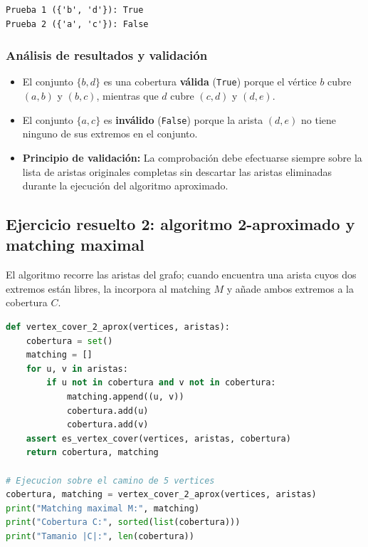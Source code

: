 \begin{lstlisting}[style=consolestyle, caption={Salida de consola del Ejercicio Resuelto 1}]
Prueba 1 ({'b', 'd'}): True
Prueba 2 ({'a', 'c'}): False
\end{lstlisting}

\subsubsection*{Análisis de resultados y validación}
\begin{itemize}
    \item El conjunto $\{b, d\}$ es una cobertura \textbf{válida} (\texttt{True}) porque el vértice $b$ cubre $(a, b)$ y $(b, c)$, mientras que $d$ cubre $(c, d)$ y $(d, e)$.
    \item El conjunto $\{a, c\}$ es \textbf{inválido} (\texttt{False}) porque la arista $(d, e)$ no tiene ninguno de sus extremos en el conjunto.
    \item \textbf{Principio de validación:} La comprobación debe efectuarse siempre sobre la lista de aristas originales completas sin descartar las aristas eliminadas durante la ejecución del algoritmo aproximado.
\end{itemize}

\subsection{Ejercicio resuelto 2: algoritmo 2-aproximado y matching maximal}
El algoritmo recorre las aristas del grafo; cuando encuentra una arista cuyos dos extremos están libres, la incorpora al matching $M$ y añade ambos extremos a la cobertura $C$.

\begin{lstlisting}[language=Python, caption={Código del Ejercicio Resuelto 2 (algoritmo aproximado y ejecución)}, label={lst:vc_aprox}]
def vertex_cover_2_aprox(vertices, aristas):
    cobertura = set()
    matching = []
    for u, v in aristas:
        if u not in cobertura and v not in cobertura:
            matching.append((u, v))
            cobertura.add(u)
            cobertura.add(v)
    assert es_vertex_cover(vertices, aristas, cobertura)
    return cobertura, matching

# Ejecucion sobre el camino de 5 vertices
cobertura, matching = vertex_cover_2_aprox(vertices, aristas)
print("Matching maximal M:", matching)
print("Cobertura C:", sorted(list(cobertura)))
print("Tamanio |C|:", len(cobertura))
\end{lstlisting}

